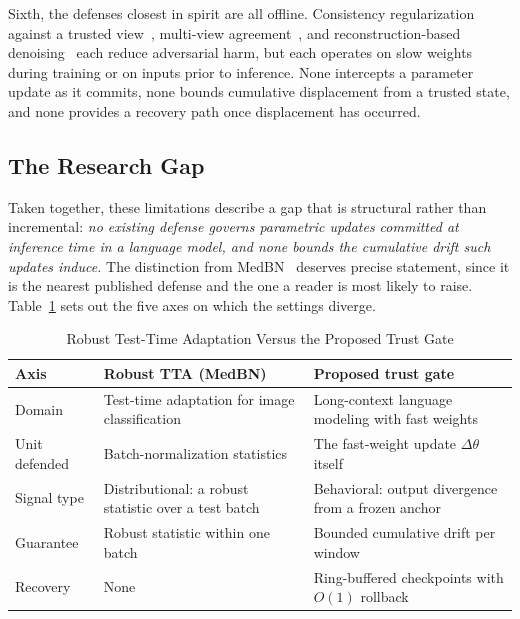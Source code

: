 \documentclass[journal]{IEEEtran}
\newcommand{\dtheta}{\Delta\theta}
\begin{document}
Sixth, the defenses closest in spirit are all offline. Consistency regularization
against a trusted view~\cite{li2024ast}, multi-view
agreement~\cite{zhang2025cola}, and reconstruction-based
denoising~\cite{wang2026insulator} each reduce adversarial harm, but each operates
on slow weights during training or on inputs prior to inference. None intercepts a
parameter update as it commits, none bounds cumulative displacement from a trusted
state, and none provides a recovery path once displacement has occurred.

\subsection{The Research Gap}

Taken together, these limitations describe a gap that is structural rather than
incremental: \emph{no existing defense governs parametric updates committed at
inference time in a language model, and none bounds the cumulative drift such
updates induce.} The distinction from MedBN~\cite{park2024medbn} deserves precise
statement, since it is the nearest published defense and the one a reader is most
likely to raise. Table~\ref{tab:gap} sets out the five axes on which the settings
diverge.

\begin{table}[!t]
\renewcommand{\arraystretch}{1.3}
\caption{Robust Test-Time Adaptation Versus the Proposed Trust Gate}
\label{tab:gap}
\centering
\footnotesize
\begin{tabular}{|p{}|p{}|p{}|}
\hline
\textbf{Axis} & \textbf{Robust TTA (MedBN)} & \textbf{Proposed trust gate} \\
\hline
Domain & Test-time adaptation for image classification & Long-context language
modeling with fast weights \\
\hline
Unit defended & Batch-normalization statistics & The fast-weight update
$\dtheta$ itself \\
\hline
Signal type & Distributional: a robust statistic over a test batch & Behavioral:
output divergence from a frozen anchor \\
\hline
Guarantee & Robust statistic within one batch & Bounded cumulative drift per window
\\
\hline
Recovery & None & Ring-buffered checkpoints with $O(1)$ rollback \\
\hline
\end{tabular}
\end{table}
\end{document}
